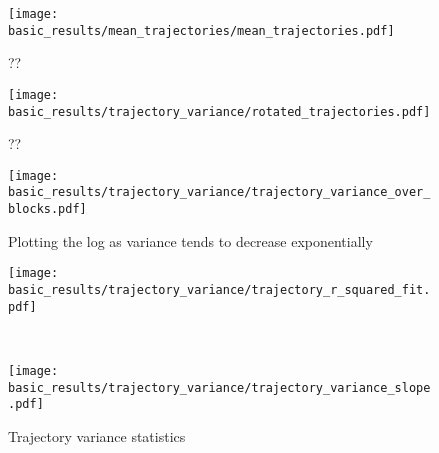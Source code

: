 \documentclass[../main.tex]{subfiles}
\begin{document}
\begin{figure}[tph]
    \centering
    \texttt{[image: basic\_results/mean\_trajectories/mean\_trajectories.pdf]}
    \caption[Mean trajectories]{??}\label{fig:mean_trajectories}
\end{figure}


\begin{figure}[tph]
    \centering
    \texttt{[image: basic\_results/trajectory\_variance/rotated\_trajectories.pdf]}
    \caption[Rotating trajectories]{??}\label{fig:rotated_trajectories}
\end{figure}


\begin{figure}[tph]
    \centering
    \texttt{[image: basic\_results/trajectory\_variance/trajectory\_variance\_over\_blocks.pdf]}
    \caption[Trajectory variance over blocks]{Plotting the log as variance tends to decrease exponentially}\label{fig:trajectory_variance}
\end{figure}


\begin{figure}[tph]
    \centering
    \begin{minipage}{0.9\textwidth}
        \texttt{[image: basic\_results/trajectory\_variance/trajectory\_r\_squared\_fit.pdf]}
        \subcaption{}
    \end{minipage}\\%
    \begin{minipage}{0.9\textwidth}
        \texttt{[image: basic\_results/trajectory\_variance/trajectory\_variance\_slope.pdf]}
      \subcaption{}
    \end{minipage}
    \caption[Trajectory variance statistics]{Trajectory variance statistics}\label{fig:trajectory_variance_fits}
\end{figure}





\end{document}
